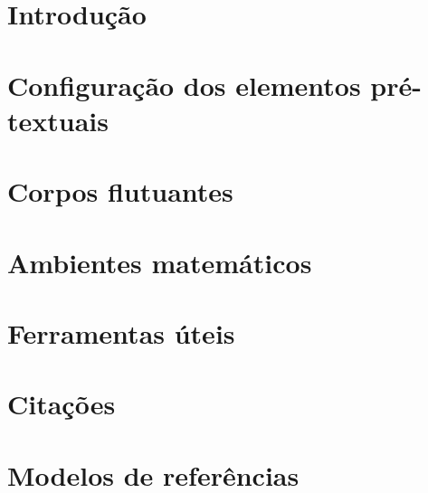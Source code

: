 \documentclass[oneside,monografia]{iftex2020}
\begin{document}
\maketitle

\chapter{Introdução} \label{cap:introducao}



\chapter{Configuração dos elementos pré-textuais}



\chapter{Corpos flutuantes}



\chapter{Ambientes matemáticos}



\chapter{Ferramentas úteis} \label{capitulo:ferramentas_uteis}



\chapter{Citações}



\chapter{Modelos de referências}
\end{document}
